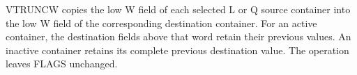 VTRUNCW copies the low W field of each selected L or Q source container into the
low W field of the corresponding destination container.  For an active
container, the destination fields above that word retain their previous values.
An inactive container retains its complete previous destination value.  The
operation leaves FLAGS unchanged.
